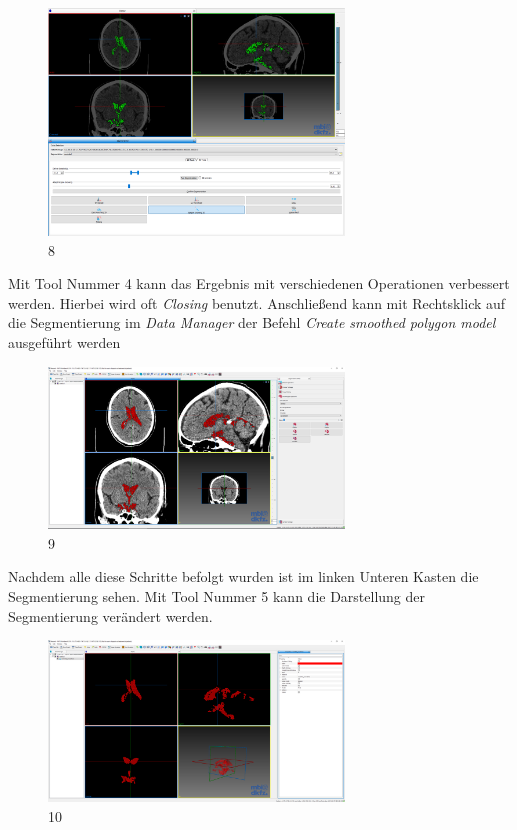 \begin{figure}[H] 
\centering 
\includegraphics[width=0.7\textwidth]{Logos/MITK_Doku/8.PNG}
\caption{8} 
\label{fig:acht} 
\end{figure}

Mit Tool Nummer 4 kann das Ergebnis mit verschiedenen Operationen verbessert werden. Hierbei wird oft \textit{Closing} benutzt. Anschließend kann mit Rechtsklick auf die Segmentierung im \textit{Data Manager} der Befehl \textit{Create smoothed polygon model} ausgeführt werden

\begin{figure}[H] 
\centering 
\includegraphics[width=0.7\textwidth]{Logos/MITK_Doku/9.PNG}
\caption{9} 
\label{fig:neun} 
\end{figure}

Nachdem alle diese Schritte befolgt wurden ist im linken Unteren Kasten die Segmentierung sehen. Mit Tool Nummer 5 kann die Darstellung der Segmentierung verändert werden.

\begin{figure}[H] 
\centering 
\includegraphics[width=0.7\textwidth]{Logos/MITK_Doku/10.PNG}
\caption{10} 
\label{fig:zehn} 
\end{figure}